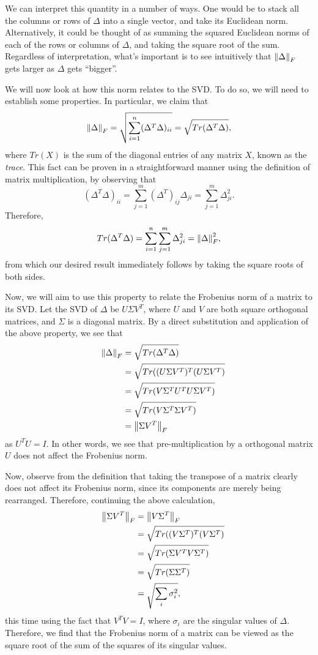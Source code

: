 \documentclass[letterpaper]{article}
\theoremstyle{remark}
\newcommand{\eqn}[1]{\begin{alignat*}{2}#1\end{alignat*}}
\begin{document}
We can interpret this quantity in a number of ways. One would be to stack all the columns or rows of $\Delta$ into a single vector, and take its Euclidean norm. Alternatively, it could be thought of as summing the squared Euclidean norms of each of the rows or columns of $\Delta$, and taking the square root of the sum. Regardless of interpretation, what's important is to see intuitively that $\norm{\Delta}_F$ gets larger as $\Delta$ gets ``bigger''.

We will now look at how this norm relates to the SVD. To do so, we will need to establish some properties. In particular, we claim that
\[
    \norm{\Delta}_F = \sqrt{\sum_{i=1}^n (\Delta^T\Delta)_{ii}} = \sqrt{Tr(\Delta^T\Delta)},
\]
where $Tr(X)$ is the sum of the diagonal entries of any matrix $X$, known as the \emph{trace}. This fact can be proven in a straightforward manner using the definition of matrix multiplication, by observing that
\[
    (\Delta^T\Delta)_{ii} = \sum_{j=1}^m (\Delta^T)_{ij}\Delta_{ji} = \sum_{j=1}^m \Delta_{ji}^2.
\]
Therefore,
\[
    Tr(\Delta^T\Delta) = \sum_{i=1}^n\sum_{j=1}^m \Delta_{ji}^2 = \norm{\Delta}_F^2,
\]
from which our desired result immediately follows by taking the square roots of both sides.

Now, we will aim to use this property to relate the Frobenius norm of a matrix to its SVD. Let the SVD of $\Delta$ be $U\Sigma V^T$, where $U$ and $V$ are both square orthogonal matrices, and $\Sigma$ is a diagonal matrix. By a direct substitution and application of the above property, we see that
\eqn{
    && \norm{\Delta}_F &= \sqrt{Tr(\Delta^T\Delta)} \\
    &&&= \sqrt{Tr((U\Sigma V^T)^T(U\Sigma V^T)} \\
    &&&= \sqrt{Tr(V\Sigma^T U^TU \Sigma V^T)} \\
    &&&= \sqrt{Tr(V\Sigma^T\Sigma V^T)} \\
    &&&= \norm{\Sigma V^T}_F
}
as $U^TU = I$. In other words, we see that pre-multiplication by a orthogonal matrix $U$ does not affect the Frobenius norm. 

Now, observe from the definition that taking the transpose of a matrix clearly does not affect its Frobenius norm, since its components are merely being rearranged. Therefore, continuing the above calculation,
\eqn{
    && \norm{\Sigma V^T}_F &= \norm{V\Sigma^T}_F \\
    &&&= \sqrt{Tr((V\Sigma^T)^T(V\Sigma^T)} \\
    &&&= \sqrt{Tr(\Sigma V^TV\Sigma^T)} \\
    &&&= \sqrt{Tr(\Sigma\Sigma^T)} \\
    &&&= \sqrt{\sum_i \sigma_i^2},
}
this time using the fact that $V^TV = I$, where $\sigma_i$ are the singular values of $\Delta$. Therefore, we find that the Frobenius norm of a matrix can be viewed as the square root of the sum of the squares of its singular values. 
\end{document}

